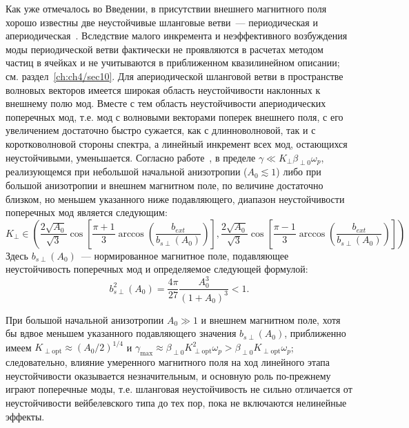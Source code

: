Как уже отмечалось во Введении, в присутствии внешнего магнитного поля хорошо известны две неустойчивые шланговые ветви~--- периодическая и апериодическая~\cite{Li2000,Camporeale2008,Lazar2013,Moya2022}. Вследствие малого инкремента и неэффективного возбуждения моды периодической ветви фактически не проявляются в расчетах методом частиц в ячейках и не учитываются в приближенном квазилинейном описании; см. раздел~\ref{ch:ch4/sec10}. Для апериодической шланговой ветви в пространстве волновых векторов имеется широкая область неустойчивости наклонных к внешнему полю мод. Вместе с тем область неустойчивости апериодических поперечных мод, т.е. мод с волновыми векторами поперек внешнего поля, с его увеличением достаточно быстро сужается, как с длинноволновой, так и с коротковолновой стороны спектра, а линейный инкремент всех мод, остающихся неустойчивыми, уменьшается. Согласно работе~\cite{Emelyanov2023_Radiophys}, в пределе $\gamma\ll K_\perp\beta_{\perp0 }\omega_p$, реализующемся при небольшой начальной анизотропии ($A_0\lesssim1$) либо при большой анизотропии и внешнем магнитном поле, по величине достаточно близком, но меньшем указанного ниже подавляющего, диапазон неустойчивости поперечных мод является следующим:
\begin{equation}
    K_\perp\in\left(\frac{2\sqrt{A_0}}{\sqrt{3}}\cos\left[\frac{\pi+1}3\arccos\left(\frac{b_{ext}}{b_{s\perp}(A_0)}\right)\right],\frac{2\sqrt{A_0}}{\sqrt{3}}\cos\left[\frac{\pi-1}3\arccos\left(\frac{b_{ext}}{b_{s\perp}(A_0)}\right)\right]\right)
    \label{eq:border_perp_inst_b0}
\end{equation}
Здесь $b_{s\perp}(A_0)$~--- нормированное магнитное поле, подавляющее неустойчивость поперечных мод и определяемое следующей формулой:
\begin{equation}
    b_{s\perp}^2(A_0)=\frac{4\pi}{27}\frac{A_0^3}{\left(1+A_0\right)^3}<1.
    \label{eq:Emel_condition}
\end{equation}

При большой начальной анизотропии $A_0 \gg 1$ и внешнем магнитном поле, хотя бы вдвое меньшем указанного подавляющего значения $b_{s\perp}(A_0)$, приближенно имеем $K_\mathrm{\perp opt} \approx (A_0/2)^{1/4}$ и $\gamma_\mathrm{max} \approx \beta_{\perp0} K_\mathrm{\perp opt}^2 \omega_p > \beta_{\perp0} K_\mathrm{\perp opt} \omega_p$; следовательно, влияние умеренного магнитного поля на ход линейного этапа неустойчивости оказывается незначительным, и основную роль по-прежнему играют поперечные моды, т.е. шланговая неустойчивость не сильно отличается от неустойчивости вейбелевского типа до тех пор, пока не включаются нелинейные эффекты.


